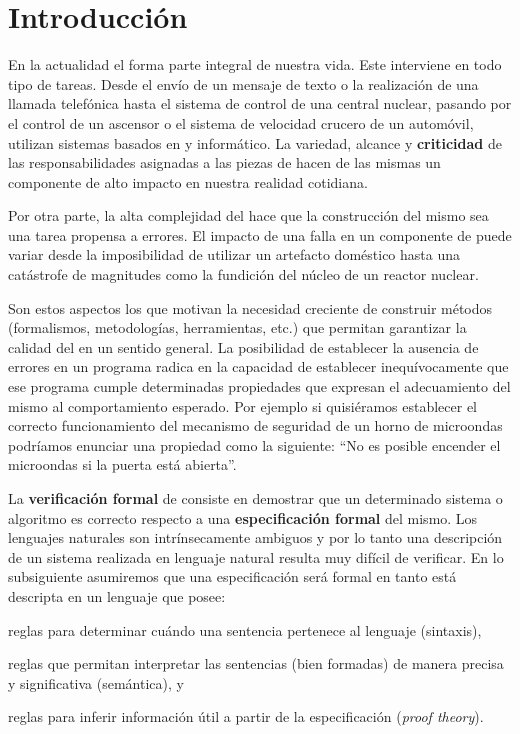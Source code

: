 
\chapter{Introducción} 
\label{intro}

En la actualidad el \soft forma parte integral de nuestra vida. Este interviene en todo tipo de tareas. Desde el envío de un mensaje de texto
o la realización de una llamada telefónica hasta el sistema de control de una
central nuclear, pasando por el control de un ascensor o el sistema de
velocidad crucero de un automóvil, utilizan sistemas basados en \hard y \soft
informático. La variedad, alcance y \textbf{criticidad} de las
responsabilidades asignadas a las piezas de \soft hacen de las mismas un
componente de alto impacto en nuestra realidad cotidiana.

Por otra parte, la alta complejidad del \soft hace que la construcción del
mismo sea una tarea propensa a errores. El impacto de una falla en un
componente de \soft puede variar desde la imposibilidad de utilizar un
artefacto doméstico hasta una catástrofe de magnitudes como la fundición del
núcleo de un reactor nuclear.

Son estos aspectos los que motivan la necesidad creciente de construir métodos
(formalismos, metodologías, herramientas, etc.) que permitan garantizar la
calidad del \soft en un sentido general. La posibilidad de establecer la
ausencia de errores en un programa radica en la capacidad de establecer
inequívocamente que ese programa cumple determinadas propiedades que expresan
el adecuamiento del mismo al comportamiento esperado. Por ejemplo si
quisiéramos establecer el correcto  funcionamiento del mecanismo de seguridad
de un horno de microondas podríamos enunciar una propiedad como la siguiente:
``No es posible encender el microondas si la puerta está abierta''.

La \textbf{verificación formal} de \soft consiste en demostrar que un
determinado sistema o algoritmo es correcto respecto a una
\textbf{especificación formal} del mismo. Los lenguajes naturales son
intrínsecamente ambiguos y por lo tanto una descripción de un sistema
realizada en lenguaje natural resulta muy difícil de verificar. En lo
subsiguiente asumiremos que una especificación será formal en tanto está
descripta en un lenguaje que posee:  \begin{inparaenum}[a)]  \item reglas para
determinar cuándo una sentencia pertenece al lenguaje (sintaxis),  \item
reglas que permitan interpretar las sentencias (bien formadas) de manera
precisa y significativa (semántica), y  \item reglas para inferir información
útil a partir de la especificación (\emph{proof theory}).  \end{inparaenum}

